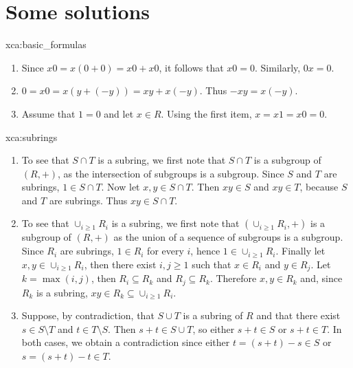 


\section*{Some solutions}

\fancyhf{}
\fancyfoot[R]{\thepage}
\fancyhead[L]{\course}
\setlength{\headheight}{14pt}

\begin{sol}{xca:basic_formulas}\
\begin{enumerate}
    \item Since $x0=x(0+0)=x0+x0$, it follows that $x0=0$. Similarly, $0x=0$. 
    \item $0=x0=x(y+(-y))=xy+x(-y)$. Thus $-xy=x(-y)$.
    \item Assume that $1=0$ and let $x\in R$. Using the first item, 
        $x=x1=x0=0$.  
\end{enumerate}
\end{sol}

 \begin{sol}{xca:subrings}\
     \begin{enumerate}
         \item To see that $S\cap T$ is a subring, we first note that
             $S\cap T$ is a subgroup of $(R,+)$, as  
             the intersection of subgroups is a subgroup. Since $S$ and $T$ are subrings, $1\in S\cap T$. 
             Now let $x,y\in S\cap T$. Then 
             $xy\in S$ and $xy\in T$, because $S$ and $T$ 
             are subrings. Thus $xy\in S\cap T$. 
        \item To see that $\cup_{i\geq1}R_i$ is a subring, we first note that $\left(\cup_{i\geq1}R_i, +\right)$ is a subgroup of $(R,+)$  as the union of a sequence of subgroups is a subgroup.
        Since $R_i$ are subrings, $1\in R_i$ for every $i$, hence $1\in \cup_{i\geq1}R_i$.
        Finally let $x,y\in \cup_{i\geq1}R_i$, then there exist $i,j\geq 1$ such that $x\in R_i$ and $y\in R_j$. Let $k=\max(i,j)$, then $R_i\subseteq R_k$ and $R_j\subseteq R_k$. Therefore $x,y\in R_k$ and, since $R_k$ is a subring, $xy\in R_k\subseteq\cup_{i\geq1}R_i.$
        \item Suppose, by contradiction, that $S\cup T$ is 
        a subring of $R$ and that there exist $s\in S\setminus T$ and $t\in T\setminus S$.
        Then $s+t\in S\cup T$, so either $s+t\in S$ or $s+t\in T$. In both cases, we obtain a contradiction since either $t=(s+t)-s\in S$ or $s=(s+t)-t\in T $.
     \end{enumerate}
 \end{sol}

